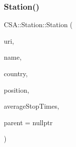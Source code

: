 \subsubsection{\texorpdfstring{Station()}{Station()}\hspace{0.1cm}{\footnotesize\ttfamily [2/3]}}
{\footnotesize\ttfamily C\+S\+A\+::\+Station\+::\+Station (\begin{DoxyParamCaption}\item[{const Q\+Url \&}]{uri,  }\item[{const Q\+Map$<$ Q\+Locale\+::\+Language, Q\+String $>$ \&}]{name,  }\item[{const Q\+Locale\+::\+Country \&}]{country,  }\item[{const Q\+Geo\+Coordinate \&}]{position,  }\item[{const qreal \&}]{average\+Stop\+Times,  }\item[{Q\+Object $\ast$}]{parent = {\ttfamily nullptr} }\end{DoxyParamCaption})\hspace{0.3cm}{\ttfamily [explicit]}}

\mbox{\label{classCSA_1_1Station_a2f28ea537ee63de36ef8b10ef4b17826}} 
